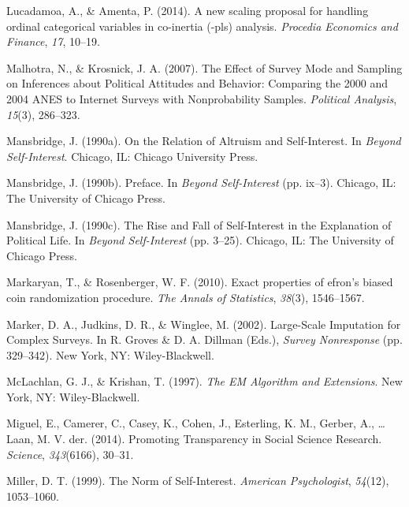 \documentclass[12pt,econ]{sources/authesis}
\begin{document}
\leavevmode\hypertarget{ref-lucadamoa_2014_scaling}{}%
Lucadamoa, A., \& Amenta, P. (2014). A new scaling proposal for handling ordinal categorical variables in co-inertia (-pls) analysis. \emph{Procedia Economics and Finance}, \emph{17}, 10--19.

\leavevmode\hypertarget{ref-malhotra_2007_effect}{}%
Malhotra, N., \& Krosnick, J. A. (2007). The Effect of Survey Mode and Sampling on Inferences about Political Attitudes and Behavior: Comparing the 2000 and 2004 ANES to Internet Surveys with Nonprobability Samples. \emph{Political Analysis}, \emph{15}(3), 286--323.

\leavevmode\hypertarget{ref-mansbridge_1990_relation}{}%
Mansbridge, J. (1990a). On the Relation of Altruism and Self-Interest. In \emph{Beyond Self-Interest}. Chicago, IL: Chicago University Press.

\leavevmode\hypertarget{ref-mansbridge_preface_1990}{}%
Mansbridge, J. (1990b). Preface. In \emph{Beyond Self-Interest} (pp. ix--3). Chicago, IL: The University of Chicago Press.

\leavevmode\hypertarget{ref-mansbridge_rise_1990}{}%
Mansbridge, J. (1990c). The Rise and Fall of Self-Interest in the Explanation of Political Life. In \emph{Beyond Self-Interest} (pp. 3--25). Chicago, IL: The University of Chicago Press.

\leavevmode\hypertarget{ref-markaryan_2010_exact}{}%
Markaryan, T., \& Rosenberger, W. F. (2010). Exact properties of efron's biased coin randomization procedure. \emph{The Annals of Statistics}, \emph{38}(3), 1546--1567.

\leavevmode\hypertarget{ref-marker_2002_large-scale}{}%
Marker, D. A., Judkins, D. R., \& Winglee, M. (2002). Large-Scale Imputation for Complex Surveys. In R. Groves \& D. A. Dillman (Eds.), \emph{Survey Nonresponse} (pp. 329--342). New York, NY: Wiley-Blackwell.

\leavevmode\hypertarget{ref-mclachlan_1997_algorithm}{}%
McLachlan, G. J., \& Krishan, T. (1997). \emph{The EM Algorithm and Extensions}. New York, NY: Wiley-Blackwell.

\leavevmode\hypertarget{ref-miguel_2014_promoting}{}%
Miguel, E., Camerer, C., Casey, K., Cohen, J., Esterling, K. M., Gerber, A., \ldots{} Laan, M. V. der. (2014). Promoting Transparency in Social Science Research. \emph{Science}, \emph{343}(6166), 30--31.

\leavevmode\hypertarget{ref-miller_norm_1999}{}%
Miller, D. T. (1999). The Norm of Self-Interest. \emph{American Psychologist}, \emph{54}(12), 1053--1060.
\end{document}
